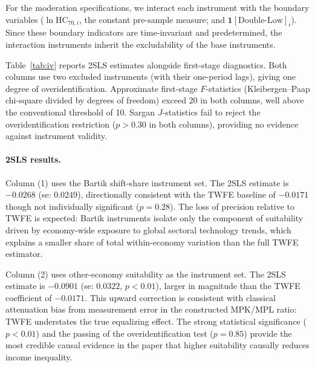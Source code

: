 \documentclass[12pt]{article}
\newcommand{\hc}{\mathrm{HC}}
\begin{document}
For the moderation specifications, we interact each instrument
with the boundary variables ($\ln\hc_{70,i}$, the constant
pre-sample measure; and $\mathbf{1}[\text{Double-Low}]_i$).
Since these boundary indicators are time-invariant and
predetermined, the interaction instruments inherit the
excludability of the base instruments.

Table~\ref{tab:iv} reports 2SLS estimates alongside first-stage
diagnostics.
Both columns use two excluded instruments (with their one-period
lags), giving one degree of overidentification.
Approximate first-stage $F$-statistics (Kleibergen--Paap chi-square
divided by degrees of freedom) exceed 20 in both columns, well
above the conventional threshold of 10.
Sargan $J$-statistics fail to reject the overidentification
restriction ($p > 0.30$ in both columns), providing no evidence
against instrument validity.

\paragraph{2SLS results.}
Column (1) uses the Bartik shift-share instrument set.
The 2SLS estimate is $-0.0268$ (se: $0.0249$), directionally
consistent with the TWFE baseline of $-0.0171$ though not
individually significant ($p = 0.28$).
The loss of precision relative to TWFE is expected: Bartik
instruments isolate only the component of suitability driven by
economy-wide exposure to global sectoral technology trends,
which explains a smaller share of total within-economy variation
than the full TWFE estimator.

Column (2) uses other-economy suitability as the instrument set.
The 2SLS estimate is $-0.0901$ (se: $0.0322$, $p < 0.01$),
larger in magnitude than the TWFE coefficient of $-0.0171$.
This upward correction is consistent with classical attenuation
bias from measurement error in the constructed MPK/MPL ratio:
TWFE understates the true equalizing effect.
The strong statistical significance ($p < 0.01$) and the passing
of the overidentification test ($p = 0.85$) provide the most
credible causal evidence in the paper that higher suitability
causally reduces income inequality.
\end{document}
